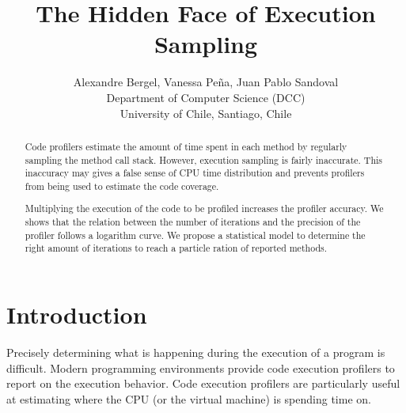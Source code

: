\documentclass{sig-alternate}
\newcommand{\Title}{The Hidden Face of Execution Sampling}
\newcommand{\TitleShort}{\Title}
\newcommand{\Authors}{Alexandre Bergel, Vanessa Pe\~na, Juan Pablo Sandoval}
\newcommand{\AuthorsShort}{A. Bergel, V. Pe\~na, J.P. Sandoval}
\newcommand{\seclabel}[1]{\label{sec:#1}}
\begin{document}
\title{\Title}

\author{\Authors\\[3mm]
Department of Computer Science (DCC)\\ University of Chile, Santiago, Chile\\[1 ex]
} 

\maketitle


\begin{abstract}
Code profilers estimate the amount of time spent in each method by regularly sampling the method call stack. 
However, execution sampling is fairly inaccurate.
This inaccuracy may gives a false sense of CPU time distribution and prevents profilers from being used to estimate the code coverage.

Multiplying the execution of the code to be profiled increases the profiler accuracy.
We shows that the relation between the number of iterations and the precision of the profiler follows a logarithm curve. 
We propose a statistical model to determine the right amount of iterations to reach a particle ration of reported methods.
\end{abstract}

\section{Introduction}\seclabel{introduction}

Precisely determining what is happening during the execution of a program is difficult. Modern programming environments provide code execution profilers to report on the execution behavior. Code execution profilers are particularly useful at estimating where the CPU (or the virtual machine) is spending time on. 
\end{document}
